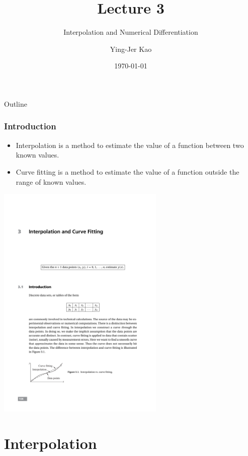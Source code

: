 \documentclass{beamer}
\title[Interpolation and Numerical Differentiation] %
{Lecture 3}
\subtitle
{Interpolation and Numerical Differentiation } %
\author[Ying-Jer Kao] %
{Ying-Jer Kao}
\institute[National Taiwan University] %
{
  Department of Physics\\
 National Taiwan University
  }
\date[Numerical Analysis and Programming] %
{\today}
\begin{document}
\begin{frame}
  \titlepage
\end{frame}

\begin{frame}{Outline}
  \tableofcontents
\end{frame}




\begin{frame}
\frametitle{Introduction}
\begin{itemize}
\item Interpolation is a method to estimate the value of a function between two known values.
\item Curve fitting is a method to estimate the value of a function outside the range of known values.
\end{itemize}
\centerline{\includegraphics[width=0.6\textwidth]{Lec9_fig0}}
\end{frame}

\section[Interpolation]{Interpolation}
\end{document}
